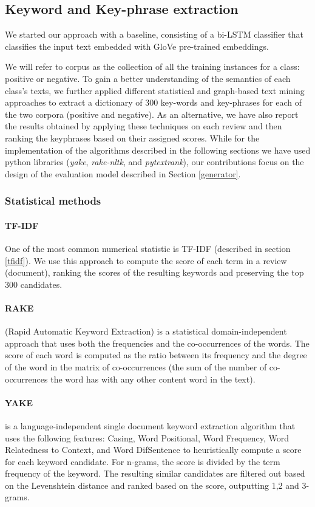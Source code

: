\subsection{Keyword and Key-phrase extraction} \label{keyword}

We started our approach with a baseline, consisting of a bi-LSTM classifier that classifies the input text embedded with GloVe pre-trained embeddings.

We will refer to corpus as the collection of all the training instances for a class: positive or negative.
To gain a better understanding of the semantics of each class's texts, we further applied different statistical and graph-based text mining approaches to extract a dictionary of 300 key-words and key-phrases for each of the two corpora (positive and negative). As an alternative, we have also report the results obtained by applying these techniques on each review and then ranking the keyphrases based on their assigned scores.
While for the implementation of the algorithms described in the following sections we have used python libraries (\textit{yake}, \textit{rake-nltk}, and \textit{pytextrank}), our contributions focus on the design of the evaluation model described in Section \ref{generator}. 
\subsubsection{Statistical methods}
\paragraph{TF-IDF}
One of the most common numerical statistic is TF-IDF (described in section \ref{tfidf}). We use this approach to compute the score of each term in a review (document), ranking the scores of the resulting keywords and preserving the top 300 candidates.
\paragraph{RAKE} (Rapid Automatic Keyword Extraction) \cite{rake} is a statistical domain-independent approach that uses both the frequencies and the co-occurrences of the words. The score of each word is computed as the ratio between its frequency and the degree of the word in the matrix of co-occurrences (the sum of the number of co-occurrences the word has with any other content word in the text).      
\paragraph{YAKE} \cite{yake} is a language-independent single document keyword extraction algorithm that uses the following features: Casing, Word Positional, Word Frequency, Word Relatedness to Context, and Word DifSentence to heuristically compute a score for each keyword candidate. For n-grams, the score is divided by the term frequency of the keyword. The resulting similar candidates are filtered out based on the Levenshtein \cite{Levenshtein} distance and ranked based on the score, outputting 1,2 and 3-grams.
